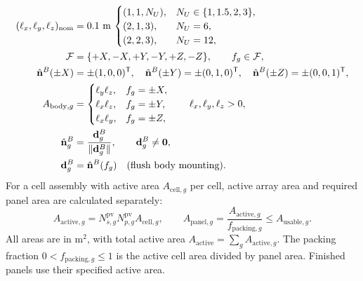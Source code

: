 \begin{align}
    (\ell_x,\ell_y,\ell_z)_{\mathrm{nom}}
    &=0.1~\mathrm{m}\,
    \begin{cases}
        (1,1,N_U), & N_U\in\{1,1.5,2,3\},\\
        (2,1,3), & N_U=6,\\
        (2,2,3), & N_U=12,
    \end{cases}
    \label{eq:nominal-body-dimensions} \\
    \mathcal F&=\{+X,-X,+Y,-Y,+Z,-Z\},\qquad f_g\in\mathcal F,
    \label{eq:array-mounting-face} \\
    \hat{\mathbf n}^{B}(\pm X)&=\pm(1,0,0)^{\mathsf T},\quad
    \hat{\mathbf n}^{B}(\pm Y)=\pm(0,1,0)^{\mathsf T},\quad
    \hat{\mathbf n}^{B}(\pm Z)=\pm(0,0,1)^{\mathsf T},
    \label{eq:body-face-normal} \\
    A_{\mathrm{body},g}
    &=\begin{cases}
        \ell_y\ell_z, & f_g=\pm X,\\
        \ell_x\ell_z, & f_g=\pm Y,\\
        \ell_x\ell_y, & f_g=\pm Z,
    \end{cases}
    \qquad \ell_x,\ell_y,\ell_z>0,
    \label{eq:body-face-area} \\
    \hat{\mathbf n}^{B}_g
    &=\frac{\mathbf d^{B}_g}{\lVert\mathbf d^{B}_g\rVert},\qquad
    \mathbf d^{B}_g\ne\mathbf 0,
    \label{eq:array-section-normal} \\
    \mathbf d^{B}_g&=\hat{\mathbf n}^{B}(f_g)
    \quad\text{(flush body mounting)}.
    \notag
\end{align}
For a cell assembly with active area $A_{\mathrm{cell},g}$ per cell, active array area and required panel area are calculated separately:
\begin{equation}
    A_{\mathrm{active},g}=N_{s,g}^{\mathrm{pv}}N_{p,g}^{\mathrm{pv}}A_{\mathrm{cell},g},
    \qquad
    A_{\mathrm{panel},g}=\frac{A_{\mathrm{active},g}}{f_{\mathrm{packing},g}}
    \leq A_{\mathrm{usable},g}.
    \label{eq:array-area-fit}
\end{equation}
All areas are in m$^2$, with total active area $A_{\mathrm{active}}=\sum_g A_{\mathrm{active},g}$. The packing fraction $0<f_{\mathrm{packing},g}\leq1$ is the active cell area divided by panel area. Finished panels use their specified active area.

